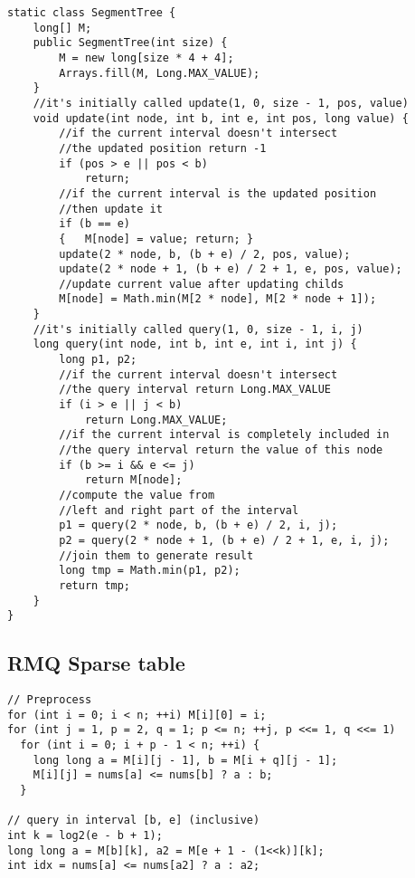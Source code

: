 \documentclass[10pt,letterpaper,twocolumn,twosided]{article}
\begin{document}
\begin{lstlisting}
static class SegmentTree {
    long[] M;
    public SegmentTree(int size) {
        M = new long[size * 4 + 4];
        Arrays.fill(M, Long.MAX_VALUE);
    }
    //it's initially called update(1, 0, size - 1, pos, value)
    void update(int node, int b, int e, int pos, long value) {
        //if the current interval doesn't intersect 
        //the updated position return -1
        if (pos > e || pos < b)
            return;
        //if the current interval is the updated position
        //then update it
        if (b == e)
        {   M[node] = value; return; }
        update(2 * node, b, (b + e) / 2, pos, value);
        update(2 * node + 1, (b + e) / 2 + 1, e, pos, value);
        //update current value after updating childs
        M[node] = Math.min(M[2 * node], M[2 * node + 1]);
    }
    //it's initially called query(1, 0, size - 1, i, j)
    long query(int node, int b, int e, int i, int j) {
        long p1, p2;
        //if the current interval doesn't intersect 
        //the query interval return Long.MAX_VALUE
        if (i > e || j < b)
            return Long.MAX_VALUE;
        //if the current interval is completely included in 
        //the query interval return the value of this node
        if (b >= i && e <= j)
            return M[node];
        //compute the value from
        //left and right part of the interval
        p1 = query(2 * node, b, (b + e) / 2, i, j);
        p2 = query(2 * node + 1, (b + e) / 2 + 1, e, i, j);
        //join them to generate result
        long tmp = Math.min(p1, p2);
        return tmp;
    }
}
\end{lstlisting}

\subsection{RMQ Sparse table}

\begin{lstlisting}
// Preprocess
for (int i = 0; i < n; ++i) M[i][0] = i;
for (int j = 1, p = 2, q = 1; p <= n; ++j, p <<= 1, q <<= 1)
  for (int i = 0; i + p - 1 < n; ++i) {
    long long a = M[i][j - 1], b = M[i + q][j - 1];
    M[i][j] = nums[a] <= nums[b] ? a : b;
  }
  
// query in interval [b, e] (inclusive)
int k = log2(e - b + 1);
long long a = M[b][k], a2 = M[e + 1 - (1<<k)][k];
int idx = nums[a] <= nums[a2] ? a : a2;

\end{lstlisting}
\end{document}
